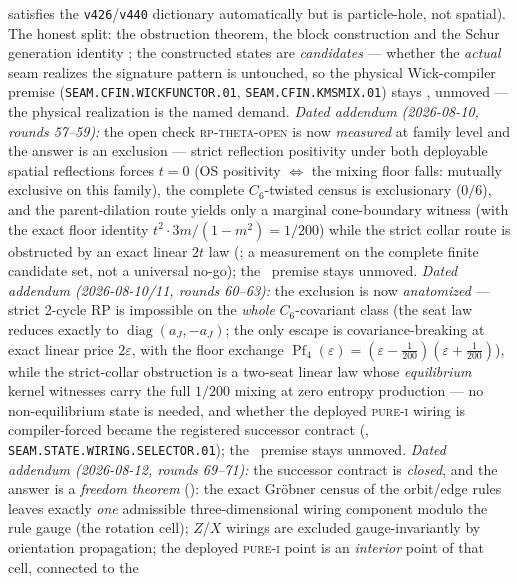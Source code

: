 \documentclass[11pt,a4paper]{article}
\theoremstyle{definition}
\begin{document}
\begin{keybox}
satisfies the \texttt{v426}/\texttt{v440} dictionary
automatically but is particle-hole, not spatial).  The honest
split: the obstruction theorem, the block construction and the
Schur generation identity \mE; the constructed states are
\emph{candidates} --- whether the \emph{actual} seam realizes
the signature pattern is untouched, so the physical
Wick-compiler premise (\texttt{SEAM.CFIN.WICKFUNCTOR.01},
\texttt{SEAM.CFIN.KMSMIX.01}) stays \mO, unmoved --- the
physical realization is the named demand.  \emph{Dated addendum
(2026-08-10, rounds 57--59):} the open check
\textsc{rp-theta-open} is now \emph{measured} at family level and
the answer is an exclusion --- strict reflection positivity under
both deployable spatial reflections forces $t = 0$ (OS positivity
$\iff$ the mixing floor falls: mutually exclusive on this
family), the complete $C_6$-twisted census is exclusionary
($0/6$), and the parent-dilation route yields only a marginal
cone-boundary witness (with the exact floor identity
$t^2 \cdot 3m/(1-m^2) = 1/200$) while the strict collar route is
obstructed by an exact linear $2t$ law
(; a measurement on the
complete finite candidate set, not a universal no-go); the
\mO\ premise stays unmoved.  \emph{Dated addendum (2026-08-10/11,
rounds 60--63):} the exclusion is now \emph{anatomized} --- strict
2-cycle RP is impossible on the \emph{whole} $C_6$-covariant
class (the seat law reduces exactly to $\operatorname{diag}(a_J,
-a_J)$; the only escape is covariance-breaking at exact linear
price $2\varepsilon$, with the floor exchange
$\operatorname{Pf}_4(\varepsilon) = (\varepsilon -
\tfrac1{200})(\varepsilon + \tfrac1{200})$), while the
strict-collar obstruction is a two-seat linear law whose
\emph{equilibrium} kernel witnesses carry the full $1/200$
mixing at zero entropy production --- no non-equilibrium state
is needed, and whether the deployed \textsc{pure-i} wiring is
compiler-forced became the registered successor contract
(,
\texttt{SEAM.STATE.WIRING.SELECTOR.01}); the \mO\ premise stays
unmoved.  \emph{Dated addendum (2026-08-12, rounds 69--71):}
the successor contract is \emph{closed}, and the answer is a
\emph{freedom theorem}
(): the exact Gr\"obner census of
the orbit/edge rules leaves exactly \emph{one} admissible
three-dimensional wiring component modulo the rule gauge (the
rotation cell); $Z$/$X$ wirings are excluded gauge-invariantly
by orientation propagation; the deployed \textsc{pure-i} point
is an \emph{interior} point of that cell, connected to the

\end{keybox}
\end{document}
